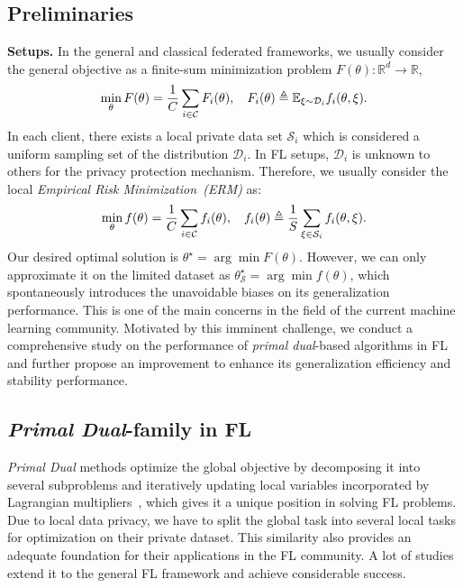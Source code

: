 \subsection{Preliminaries}
\textbf{Setups.} In the general and classical federated frameworks, we usually consider the general objective as a finite-sum minimization problem $F(\theta): \mathbb{R}^d\rightarrow \mathbb{R}$,
\begin{equation}
    \small
    \min_\theta F(\theta) = \frac{1}{C}\sum_{i\in\mathcal{C}}F_i(\theta), \quad F_i(\theta)\triangleq \mathbb{E}_{\xi\sim\mathcal{D}_i}f_i(\theta,\xi).
\end{equation}
In each client, there exists a local private data set $\mathcal{S}_i$ which is considered a uniform sampling set of the distribution $\mathcal{D}_i$. In FL setups, $\mathcal{D}_i$ is unknown to others for the privacy protection mechanism. Therefore, we usually consider the local \textit{Empirical Risk Minimization~(ERM)} as:
\begin{equation}
\label{global_objective}
    \small
    \min_\theta f(\theta) = \frac{1}{C}\sum_{i\in\mathcal{C}}f_i(\theta), \quad f_i(\theta)\triangleq \frac{1}{S}\sum_{\xi\in\mathcal{S}_i}f_i(\theta,\xi).
\end{equation}
Our desired optimal solution is $\theta^\star=\arg\min F(\theta)$. However, we can only approximate it on the limited dataset as $\theta_{\mathcal{S}}^\star=\arg\min f(\theta)$, which spontaneously introduces the unavoidable biases on its generalization performance. This is one of the main concerns in the field of the current machine learning community. Motivated by this imminent challenge, we conduct a comprehensive study on the performance of \textit{primal dual}-based algorithms in FL and further propose an improvement to enhance its generalization efficiency and stability performance.

\subsection{\textit{Primal Dual}-family in FL}
\textit{Primal Dual} methods optimize the global objective by decomposing it into several subproblems and iteratively updating local variables incorporated by Lagrangian multipliers~\citep{boyd2011distributed}, which gives it a unique position in solving FL problems. Due to local data privacy, we have to split the global task into several local tasks for optimization on their private dataset. This similarity also provides an adequate foundation for their applications in the FL community. A lot of studies extend it to the general FL framework and achieve considerable success. 


